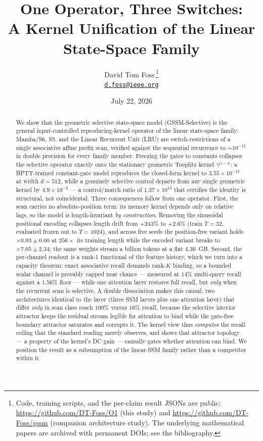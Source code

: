 \documentclass[11pt]{article}
\title{\bfseries One Operator, Three Switches:\\
A Kernel Unification of the Linear State-Space Family}
\author{David Tom Foss\,\orcidlink{0009-0004-0289-7154}\thanks{Code, training scripts, and the per-claim result
JSONs are public: \url{https://github.com/DT-Foss/O1} (this study) and
\url{https://github.com/DT-Foss/gssm} (companion architecture study). The
underlying mathematical papers are archived with permanent DOIs; see the
bibliography.}\\[3pt]
{\normalsize\href{mailto:d.foss@ieee.org}{\texttt{d.foss@ieee.org}}}}
\date{July 22, 2026}
\theoremstyle{definition}
\begin{document}
\maketitle

\begin{abstract}
We show that the geometric selective state-space model (GSSM-Selective) is the general
input-controlled reproducing-kernel operator of the linear state-space family: Mamba/S6,
S5, and the Linear Recurrent Unit (LRU) are switch-restrictions of a single associative
affine prefix scan, verified against the sequential recurrence to $\sim\!10^{-15}$ in
double precision for every family member. Freezing the gates to constants collapses the
selective operator exactly onto the stationary geometric Toeplitz kernel
$\gamma^{|s-t|}$: a BPTT-trained constant-gate model reproduces the closed-form kernel to
$3.55\times10^{-15}$ at width $d=512$, while a genuinely selective control departs from any
single geometric kernel by $4.9\times10^{-2}$ --- a control/match ratio of $1.37\times10^{13}$
that certifies the identity is structural, not coincidental. Three consequences follow from
one operator. First, the scan carries no absolute-position term: its memory kernel depends
only on relative lags, so the model is length-invariant \emph{by construction}. Removing the
sinusoidal positional encoding collapses length drift from $+243\%$ to $+2.6\%$ (train
$T{=}32$, evaluated frozen out to $T{=}1024$), and across five seeds the position-free variant
holds $\times0.93\pm0.00$ at $256\times$ its training length while the encoded variant breaks to
$\times7.05\pm2.34$; the same weights stream a billion tokens at a flat $4.36$~GB. Second, the
per-channel readout is a rank-1 functional of the feature history, which we turn into a
capacity theorem: exact associative recall demands rank-$K$ binding, so a bounded scalar
channel is provably capped near chance --- measured at $14\%$ multi-query recall against a
$1.56\%$ floor --- while one attention layer restores full recall, but \emph{only} when the
recurrent scan is selective. A double dissociation makes this causal: two architectures
identical to the layer (three SSM layers plus one attention layer) that differ \emph{only} in
scan class reach $100\%$ versus $16\%$ recall, because the selective interior attractor keeps
the residual stream legible for attention to bind while the gate-free boundary attractor
saturates and corrupts it. The kernel view thus \emph{computes} the recall ceiling that the
standard reading merely observes, and shows that attractor topology --- a property of the
kernel's DC gain --- causally gates whether attention can bind. We position the result as a
subsumption of the linear-SSM family rather than a competitor within it.
\end{abstract}
\end{document}
